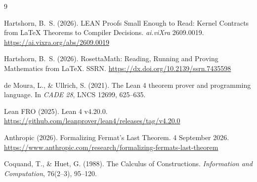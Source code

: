 \documentclass[11pt]{article}
\begin{document}
\begin{thebibliography}{9}

 Hartshorn, B.~S. (2026). LEAN Proofs Small Enough
to Read: Kernel Contracts from \LaTeX{} Theorems to Compiler Decisions.
\emph{ai.viXra} 2609.0019.
\url{https://ai.vixra.org/abs/2609.0019}

 Hartshorn, B.~S. (2026). RosettaMath: Reading,
Running and Proving Mathematics from \LaTeX{}. SSRN.
\newline
\url{https://dx.doi.org/10.2139/ssrn.7435598}

 de Moura, L., \& Ullrich, S. (2021). The Lean 4
theorem prover and programming language. In \emph{CADE 28}, LNCS 12699,
625--635.

 Lean FRO (2025). Lean 4 v4.20.0.
\url{https://github.com/leanprover/lean4/releases/tag/v4.20.0}

 Anthropic (2026). Formalizing Fermat's Last Theorem.
4 September 2026.
\newline
\url{https://www.anthropic.com/research/formalizing-fermats-last-theorem}

 Coquand, T., \& Huet, G. (1988). The Calculus of
Constructions. \emph{Information and Computation}, 76(2--3), 95--120.

\end{thebibliography}
\end{document}
